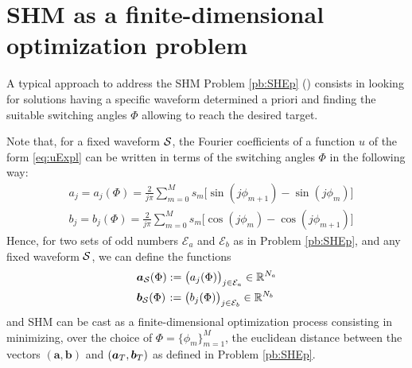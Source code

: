 \documentclass[twocolumn]{autart}    %
\begin{document}
\section{SHM as a finite-dimensional optimization problem}\label{sec:SHE_finite-dim_pbm}

A typical approach to address the SHM Problem \ref{pb:SHEp} (\cite{Sun1996,Konstantinou2010,Yang2015}) consists in looking for solutions having a specific waveform determined a priori and finding the suitable switching angles $\Phi$ allowing to reach the desired target. 

Note that, for a fixed waveform $\mathcal{S}$, the Fourier coefficients of a function $u$ of the form \eqref{eq:uExpl} can be written in terms of the switching angles $\Phi$ in the following way:
\begin{align*}
	& a_j = a_j(\Phi) =  \frac{2}{j\pi} \sum_{m=0}^{M} s_m \Big[\sin(j\phi_{m+1}) -\sin(j\phi_{m})\Big]
	\\[5pt]
	& b_j = b_j(\Phi) = \frac{2}{j\pi} \sum_{m=0}^{M} s_m \Big[\cos(j\phi_{m}) -\cos(j\phi_{m+1})\Big]
\end{align*}
Hence, for two sets of odd numbers $\mathcal{E}_a$ and $\mathcal{E}_b$ as in Problem \ref{pb:SHEp}, and any fixed waveform $\mathcal{S}$, we can define the functions
\begin{align*}
	&\bm{a}_{\mathcal{S}} (\Phi) := \big(a_j (\Phi)\big)_{j\in \mathcal{E}_a} \in \mathbb{R}^{N_a}
	\\
	&\bm{b}_{\mathcal{S}} (\Phi) \hspace{0.1em}:= \big(b_j (\Phi)\big)_{j\in \mathcal{E}_b} \in \mathbb{R}^{N_b}
\end{align*}
and SHM can be cast as a finite-dimensional optimization process consisting in minimizing, over the choice of $\Phi = \{\phi_m\}_{m=1}^{M}$, the euclidean distance between the vectors $(\bm{a},\bm{b})$ and $(\bm{a}_T,\bm{b}_T)$ as defined in Problem \ref{pb:SHEp}.

\bigskip
\end{document}
